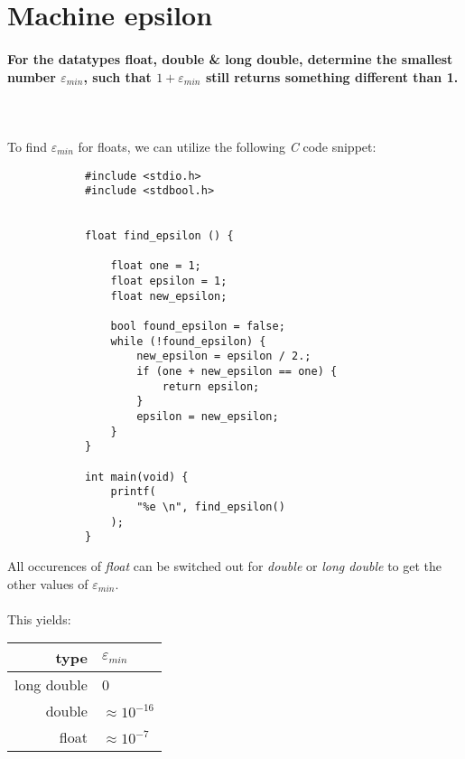 \documentclass[11 pt]{article}
\begin{document}
    \newpage
    \section{Machine epsilon} 
        \paragraph{For the datatypes float, double \& long double, 
            determine the smallest number $\varepsilon_{min}$, such 
            that $1+\varepsilon_{min}$ still returns something different than 1.
        } \ \\ \\
        To find $\varepsilon_{min}$ for floats, we can utilize the following \textit{C} code 
        snippet: 
        \begin{lstlisting}
            #include <stdio.h>
            #include <stdbool.h>
            
            
            float find_epsilon () {
            
                float one = 1;
                float epsilon = 1;
                float new_epsilon;
            
                bool found_epsilon = false;
                while (!found_epsilon) {
                    new_epsilon = epsilon / 2.;
                    if (one + new_epsilon == one) {
                        return epsilon;
                    }
                    epsilon = new_epsilon;
                }
            }
            
            int main(void) {
                printf(
                    "%e \n", find_epsilon()
                );
            }
        \end{lstlisting}
        All occurences of \textit{float} can be switched out for \textit{double} 
        or \textit{long double} to get the other values of  $\varepsilon_{min}$. \\
        \\
        This yields:
        \begin{table}[h!]
            \begin{center}
                \begin{tabular}{r|l}
                    type & $\varepsilon_{min}$ \\
                    \hline
                    long double & 0 \\
                    double & $\approx10^{-16}$ \\
                    float & $\approx10^{-7}$ 
                \end{tabular}
            \end{center}
        \end{table} 
\end{document}
